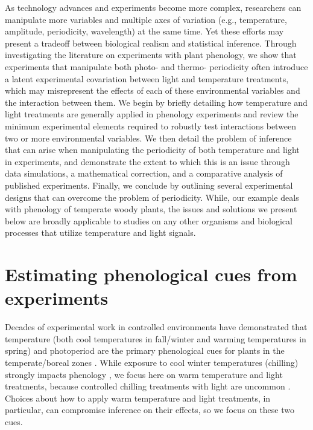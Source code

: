 \documentclass[11pt]{article}
\begin{document}
As technology advances and experiments become more complex, researchers can manipulate more variables and multiple axes of variation (e.g., temperature, amplitude, periodicity, wavelength) at the same time. Yet these efforts may present a tradeoff between biological realism and statistical inference. Through investigating the literature on experiments with plant phenology, we show that experiments that manipulate both photo- and thermo- periodicity often introduce a latent experimental covariation between light and temperature treatments, which may misrepresent the effects of each of these environmental variables and the interaction between them. We begin by briefly detailing how temperature and light treatments are generally applied in phenology experiments and review the minimum experimental elements required to robustly test interactions between two or more environmental variables. We then detail the problem of inference that can arise when manipulating the periodicity of both temperature and light in experiments, and demonstrate the extent to which this is an issue through data simulations, a mathematical correction, and a comparative analysis of published experiments. Finally, we conclude by outlining several experimental designs that can overcome the problem of periodicity. While, our example deals with phenology of temperate woody plants, the issues and solutions we present below are broadly applicable to studies on any other organisms and biological processes that utilize temperature and light signals. 

\section*{Estimating phenological cues from experiments}
Decades of experimental work in controlled environments have demonstrated that temperature (both cool temperatures in fall/winter and warming temperatures in spring) and photoperiod are the primary phenological cues for plants in the temperate/boreal zones \citep{Ettinger:2020aa}. While exposure to cool winter temperatures (chilling) strongly impacts phenology \citep{Laube2014}, we focus here on warm temperature and light treatments, because controlled chilling treatments with light are uncommon \citep{limitingcues}. Choices about how to apply warm temperature and light treatments, in particular, can compromise inference on their effects, so we focus on these two cues.
\end{document}
